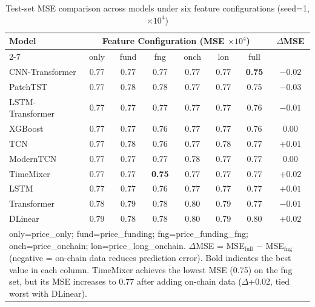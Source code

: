 \begin{table}[t]
\centering
\footnotesize
\setlength{\tabcolsep}{1.5pt}
\caption{Test-set MSE comparison across models under six feature configurations (seed=1, $\times 10^{4}$)}
\label{tab:mse_ablation}
\begin{tabular}{lccccccc}
\toprule
\multirow{2}{*}{Model} & \multicolumn{6}{c}{Feature Configuration (MSE $\times 10^{4}$)} & \multirow{2}{*}{$\Delta$MSE} \\
\cmidrule(lr){2-7}
& only & fund & fng & onch & lon & full \\
\midrule
CNN-Transformer & 0.77 & 0.77 & 0.77 & 0.77 & 0.77 & \textbf{0.75} & \textbf{$-0.02$} \\
PatchTST & 0.77 & 0.78 & 0.78 & 0.77 & 0.77 & 0.75 & $-0.03$ \\
LSTM-Transformer & 0.77 & 0.77 & 0.77 & 0.77 & 0.77 & 0.76 & $-0.01$ \\
XGBoost & 0.77 & 0.77 & 0.76 & 0.77 & 0.77 & 0.76 & 0.00 \\
TCN & 0.77 & 0.78 & 0.76 & 0.77 & 0.78 & 0.77 & $+0.01$ \\
ModernTCN & 0.77 & 0.77 & 0.77 & 0.78 & 0.77 & 0.77 & 0.00 \\
TimeMixer & 0.77 & 0.77 & \textbf{0.75} & 0.77 & 0.77 & 0.77 & $+0.02$ \\
LSTM & 0.77 & 0.77 & 0.76 & 0.77 & 0.77 & 0.77 & $+0.01$ \\
Transformer & 0.78 & 0.79 & 0.78 & 0.80 & 0.79 & 0.77 & $-0.01$ \\
DLinear & 0.79 & 0.78 & 0.78 & 0.80 & 0.79 & 0.80 & $+0.02$ \\
\bottomrule
\multicolumn{8}{p{0.85\textwidth}}{\footnotesize only=price\_only; fund=price\_funding; fng=price\_funding\_fng; onch=price\_onchain; lon=price\_long\_onchain. $\Delta$MSE = MSE$_{\text{full}}$ $-$ MSE$_{\text{fng}}$ (negative = on-chain data reduces prediction error). Bold indicates the best value in each column. TimeMixer achieves the lowest MSE (0.75) on the fng set, but its MSE increases to 0.77 after adding on-chain data ($\Delta$+0.02, tied worst with DLinear).}
\end{tabular}
\end{table}
